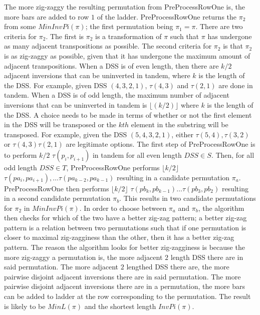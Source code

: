 The more zig-zaggy the resulting permutation from {\sc PreProcessRowOne} is, the more bars are added 
to row $1$ of the ladder. {\sc PreProcessRowOne} returns the $\pi_{2}$ from some $MinInvPi(\pi)$; the first permutation being $\pi_{1}=\pi$. 
There are two criteria for $\pi_{2}$. The first is $\pi_{2}$ is a transformation of $\pi$ such that $\pi$ 
has undergone as many adjacent transpositions as possible.
The second criteria for $\pi_{2}$ is that $\pi_{2}$ is as zig-zaggy as possible, given that it has undergone the maximum amount of 
adjacent transpositions. When a DSS is of even length, then there are $k/2$ adjacent inversions that can be uninverted in tandem, 
where $k$ is the length of the DSS. 
For example, given DSS $(4,3,2,1)$, $\tau(4,3)$ and $\tau(2,1)$ are done in tandem. When a DSS is of odd length, the maximum 
number of adjacent inversions that can be uninverted in tandem is $\lfloor(k/2)\rfloor$ where $k$ is the length of the DSS. A choice 
needs to be made in terms of whether or not the first element in the DSS will be transposed or the $kth$ element in the substring will be 
transposed. For example, given the DSS $(5,4,3,2,1)$, either $\tau(5,4),\tau(3,2)$ or $\tau(4,3)\tau(2,1)$ are legitimate options. 
The first step of {\sc PreProcessRowOne} is to perform  $k/2$ $\tau(p_{i},p_{i+1})$ in tandem for all
even length $DSS \in S$. Then, for all odd length $DSS \in T$,
 {\sc PreProcessRowOne} performs $\lfloor k/2\rfloor$ $\tau(pa_{i}, pa_{i+1}), \dots \tau(pa_{k-2},pa_{k-1})$
resulting in a candidate permutation $\pi_{a}$. {\sc PreProcessRowOne} then performs 
$\lfloor k/2 \rfloor$ $\tau(pb_{k},pb_{k-1}) \dots \tau(pb_{3},pb_{2})$
resulting in a second candidate permutation $\pi_{b}$.
This results in two candidate permutations for $\pi_{2}$ in $MinInvPi(\pi)$. 
In order to choose between $\pi_{a}$ and $\pi_{b}$, 
the algorithm then checks for which of the two have a better zig-zag pattern; a better zig-zag 
pattern is a relation between two permutations such that if one permutation is closer to maximal zig-zagginess 
than the other, then it has a better zig-zag pattern. The reason the algorithm looks 
for better zig-zagginess is because the more zig-zaggy a permutation is, the more adjacent
$2$ length DSS there are in said permutation. The more adjacent $2$ lengthed DSS there are, 
the more pairwise disjoint adjacent inversions there are in said permutation. 
The more pairwise disjoint adjacent 
inversions there are in a permutation, the more bars can be added to ladder at the row corresponding to the permutation. 
The result is likely to be $MinL(\pi)$ and the shortest length $InvPi(\pi)$. 
